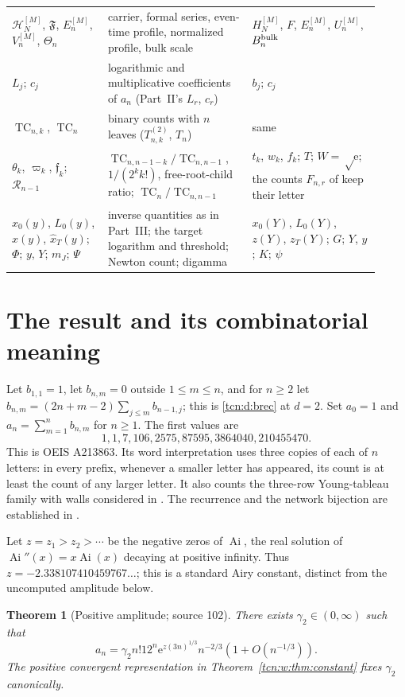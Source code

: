\documentclass[11pt,letterpaper]{article}
\newcommand{\Ai}{\operatorname{Ai}}
\newcommand{\ee}{\mathrm e}
\newcommand{\TC}{\operatorname{TC}}
\newtheorem{theorem}{Theorem}[section]
\theoremstyle{remark}
\begin{document}
\begin{longtable}{@{}>{\raggedright}p{0.24\linewidth}>{\raggedright}p{0.36\linewidth}>{\raggedright\arraybackslash}p{0.32\linewidth}@{}}
$\mathcal H_N^{[M]}$, $\mathfrak F$, $E_n^{[M]}$, $V_n^{[M]}$, $\Theta_n$ & carrier, formal series, even-time profile, normalized profile, bulk scale & $H_N^{[M]}$, $F$, $E_n^{[M]}$, $U_n^{[M]}$, $B_n^{\rm bulk}$\\
$L_j$; $c_j$ & logarithmic and multiplicative coefficients of $a_n$ (Part~II's $L_r$, $c_r$) & $b_j$; $c_j$\\
$\TC_{n,k}$, $\TC_n$ & binary counts with $n$ leaves ($T^{(2)}_{n,k}$, $T_n$) & same\\
$\theta_k$, $\varpi_k$, $\mathfrak f_k$; $\mathcal R_{n-1}$ & $\TC_{n,n-1-k}/\TC_{n,n-1}$, $1/(2^kk!)$, free-root-child ratio; $\TC_n/\TC_{n,n-1}$ & $t_k$, $w_k$, $f_k$; $T$; $W=\sqrt\ee$; the counts $F_{n,r}$ of \cite{Chang2024} keep their letter\\
$x_0(y)$, $L_0(y)$, $\hat x(y)$, $\hat x_T(y)$; $\Phi$; $y$, $Y$; $m_J$; $\Psi$ & inverse quantities as in Part~III; the target logarithm and threshold; Newton count; digamma & $x_0(Y)$, $L_0(Y)$, $z(Y)$, $z_T(Y)$; $G$; $Y$, $y$; $K$; $\psi$\\
\bottomrule
\end{longtable}
\endgroup

\section{The result and its combinatorial meaning}\label{tcn:w:sec:results}
Let $b_{1,1}=1$, let $b_{n,m}=0$ outside $1\le m\le n$, and for $n\ge2$ let $b_{n,m}=(2n+m-2)\sum_{j\le m}b_{n-1,j}$; this is \eqref{tcn:d:brec} at $d=2$. Set $a_0=1$ and $a_n=\sum_{m=1}^n b_{n,m}$ for $n\ge1$. The first values are
\[
 1,1,7,106,2575,87595,3864040,210455470.
\]
This is OEIS A213863. Its word interpretation uses three copies of each of $n$ letters: in every prefix, whenever a smaller letter has appeared, its count is at least the count of any larger letter. It also counts the three-row Young-tableau family with walls considered in \cite{BW2021}. The recurrence and the network bijection are established in \cite{FYZ2021}.

Let $z=z_1>z_2>\cdots$ be the negative zeros of $\Ai$, the real solution of $\Ai''(x)=x\Ai(x)$ decaying at positive infinity. Thus $z=-2.338107410459767\ldots$; this is a standard Airy constant, distinct from the uncomputed amplitude below.
\begin{theorem}[Positive amplitude; source 102]\label{tcn:w:thm:leading}
There exists $\gamma_2\in(0,\infty)$ such that
\begin{equation}\label{tcn:w:main}
 a_n=\gamma_2 n!12^n\ee^{z(3n)^{1/3}}n^{-2/3}
          \left(1+O(n^{-1/3})\right).
\end{equation}
The positive convergent representation in Theorem~\ref{tcn:w:thm:constant} fixes $\gamma_2$ canonically.
\end{theorem}
\end{document}
